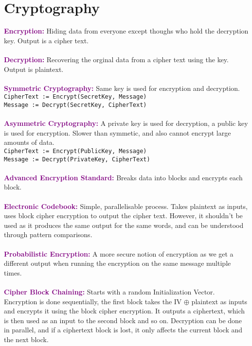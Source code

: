 \documentclass[a4paper,10pt]{article}
\begin{document}
\section{Cryptography}
\textcolor{Purple}{\textbf{Encryption:}} Hiding data from everyone except thoughs who hold the decryption key. Output is a cipher text. \\\\
\textcolor{Purple}{\textbf{Decryption:}} Recovering the orginal data from a cipher text using the key. Output is plaintext. \\\\
\textcolor{Purple}{\textbf{Symmetric Cryptography:}} Same key is used for encryption and decryption. \\
\texttt{CipherText := Encrypt(SecretKey, Message)} \\
\texttt{Message := Decrypt(SecretKey, CipherText)}\\\\
\textcolor{Purple}{\textbf{Asymmetric Cryptography:}} A private key is used for decryption, a public key is used for encryption. Slower than symmetic, and also cannot encrypt large amounts of data.  \\
\texttt{CipherText := Encrypt(PublicKey, Message)} \\
\texttt{Message := Decrypt(PrivateKey, CipherText)}\\\\
\textcolor{Purple}{\textbf{Advanced Encryption Standard:}} Breaks data into blocks and encrypts each block. \\\\
\textcolor{Purple}{\textbf{Electronic Codebook:}} Simple, parallelisable process. Takes plaintext as inputs, uses block cipher encryption to output the cipher text. However, it shouldn't be used as it produces the same output for the same words, and can be understood through pattern comparisons. \\\\
\textcolor{Purple}{\textbf{Probabilistic Encryption:}} A more secure notion of encryption as we get a different output when running the encryption on the same message multiple times. \\\\
\textcolor{Purple}{\textbf{Cipher Block Chaining:}} Starts with a random Initialization Vector. Encryption is done sequentially, the first block takes the IV $\oplus $ plaintext as inputs and encrypts it using the block cipher encryption. It outputs a ciphertext, which is then used as an input to the second block and so on. Decryption can be done in parallel, and if a ciphertext block is lost, it only affects the current block and the next block. \\\\
\end{document}
